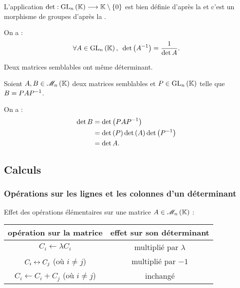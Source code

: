 \begin{dem}
L'application \(\det:\GL{n}\to\K\excluant\accol{0}\) est bien définie d'après la  et c'est un morphisme de groupes d'après la .
\end{dem}

\begin{cor}
On a : \[\quantifs{\forall A\in\GL{n}}\det\paren{A\inv}=\dfrac{1}{\det A}.\]
\end{cor}

\begin{rem}
Deux matrices semblables ont même déterminant.
\end{rem}

\begin{dem}
Soient \(A,B\in\M{n}\) deux matrices semblables et \(P\in\GL{n}\) telle que \(B=PAP^{-1}\).

On a : \[\begin{aligned}
\det B&=\det\left(PAP^{-1}\right) \\
&=\det\left(P\right)\det\left(A\right)\det\left(P^{-1}\right) \\
&=\det A.
\end{aligned}\]
\end{dem}

\subsection{Calculs}

\subsubsection{Opérations sur les lignes et les colonnes d'un déterminant}

Effet des opérations élémentaires sur une matrice \(A\in\M{n}\) :

\begin{center}
\begin{tabular}{|c|c|}
\hline
opération sur la matrice & effet sur son déterminant \\
\hline
\(C_i\gets\lambda C_i\) & multiplié par \(\lambda\) \\
\hline
\(C_i\leftrightarrow C_j\) (où \(i\not=j\)) & multiplié par \(-1\) \\
\hline
\(C_i\gets C_i+C_j\) (où \(i\not=j\)) & inchangé \\
\hline
\end{tabular}
\end{center}

